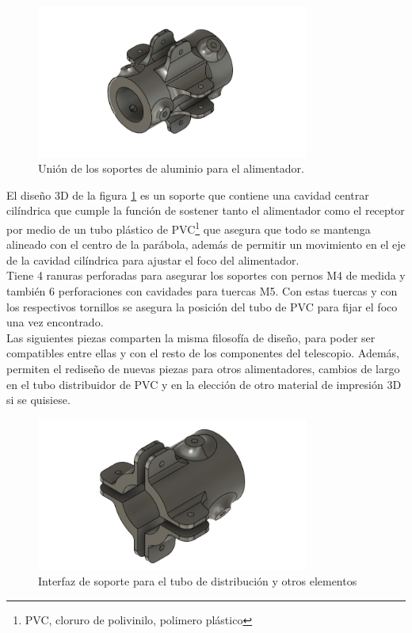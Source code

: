 \begin{figure}
    \centering
    \includegraphics[width=0.8\textwidth]{img/soporte3D5}
    \caption{Unión de los soportes de aluminio para el alimentador.}
    \label{fig:ensamble4}
\end{figure}

El diseño 3D de la figura \ref{fig:ensamble4} es un soporte que contiene una cavidad centrar cilíndrica que cumple la función de sostener tanto el alimentador como el receptor por medio de un tubo plástico de PVC\footnote{PVC, cloruro de polivinilo, polimero plástico} que asegura que todo se mantenga alineado con el centro de la parábola, además de permitir un movimiento en el eje de la cavidad cilíndrica para ajustar el foco del alimentador.\\

Tiene 4 ranuras perforadas para asegurar los soportes con pernos M4 de medida y también 6 perforaciones con cavidades para tuercas M5. Con estas tuercas y con los respectivos tornillos se asegura la posición del tubo de PVC para fijar el foco una vez encontrado.\\

Las siguientes piezas comparten la misma filosofía de diseño, para poder ser compatibles entre ellas y con el resto de los componentes del telescopio. Además, permiten el rediseño de nuevas piezas para otros alimentadores, cambios de largo en el tubo distribuidor de PVC y en la elección de otro material de impresión 3D si se quisiese.\\

\begin{figure}
    \centering
    \includegraphics[width=0.8\textwidth]{img/soporte3D1v1}
    \caption{Interfaz de soporte para el tubo de distribución y otros elementos}
    \label{fig:ensamble5}
\end{figure}

